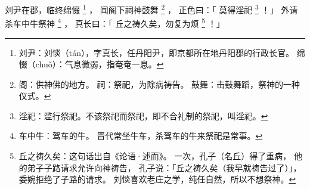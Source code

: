 
\switchcolumn*[\section{}]

刘尹在郡，临终绵惙%
\footnote{%
    刘尹：刘惔（tán），字真长，任丹阳尹，即京都所在地丹阳郡的行政长官。
    绵惙（chuǒ）：气息微弱，指奄奄一息。
}%
，
闻阁下祠神鼓舞%
\footnote{%
    阁：供神佛的地方。
    祠：祭祀，为除病祷告。
    鼓舞：击鼓舞蹈，祭神的一种仪式。
}%
，
正色曰：「
    莫得淫祀%
    \footnote{%
        淫祀：滥行祭祀。不该祭祀而祭祀，即不合礼制的祭祀，叫淫祀。
    }%
！」
外请杀车中牛祭神%
\footnote{%
    车中牛：驾车的牛。
            晋代常坐牛车，杀驾车的牛来祭祀是常事。
}%
，
真长曰：「
    丘之祷久矣，勿复为烦%
    \footnote{%
        丘之祷久矣：这句话出自《论语·述而》。
                    一次，孔子（名丘）得了重病，
                    他的弟子子路请求允许向神祷告，
                    孔子说：「丘之祷久矣（我早就祷告过了）」，
                    委婉拒绝了子路的请求。
                    刘惔喜欢老庄之学，纯任自然，所以不想祭神。
    }%
！」

\switchcolumn



